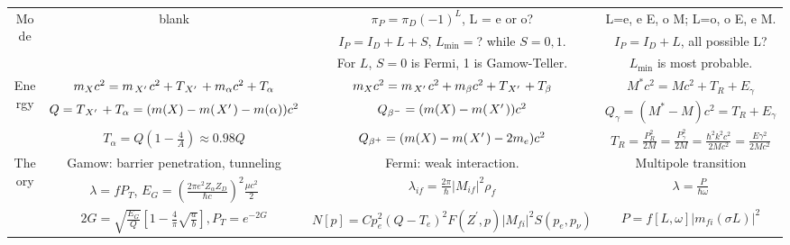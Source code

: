 \documentclass{school-22.101-notes}
\begin{document}
\begin{enumerate}
\begin{table}[ht]
\begin{tabular}{|c|c|c|c|}
    \multirow{3}{*}{Mode} & \multirow{3}{*}{blank} & $\pi_P = \pi_D (-1)^L$, L = e or o? & L=e, e E, o M; L=o, o E, e M. \\
    & & $I_P = I_D + L + S$, $L_{\mathrm{min}} =$? while $S = 0,1$. & $I_P = I_D + L$, all possible L? \\
    & & For $L$, $S=0$ is Fermi, 1 is Gamow-Teller. & $L_{\mathrm{min}}$ is most probable.    \\ \hline
    \multirow{3}{*}{Energy} & $m_X c^2 = m_{\left.X^{\prime}\right.}c^2 + T_{\left.X^{\prime}\right.} + m_{\alpha} c^2 + T_{\alpha}$ 
    & $m_X c^2 = m_{\left.X^{\prime}\right.} c^2 + m_{\beta} c^2 + T_{\left.X^{\prime}\right.} + T_{\beta}$ 
    & $M^* c^2 = Mc^2 + T_R + E_{\gamma}$ 
    \\ 
    & $Q = T_{\left.X^{\prime}\right.} + T_{\alpha} = (m(X) - m(\left.X^{\prime}\right.) - m(\alpha) )c^2$ 
    & $Q_{\beta^-} = (m(X) - m(\left.X^{\prime}\right.))c^2$
    & $Q_{\gamma} =  (M^* - M)c^2  = T_R + E_{\gamma}$
    \\ 
    & $T_{\alpha} = Q \left( 1 - \frac{4}{A} \right) \approx 0.98 Q$ 
    & $Q_{\beta^+} = (m(X) - m(\left.X^{\prime}\right.) - 2m_e) c^2$
    & $T_R = \frac{P_R^2}{2M} = \frac{P_{\gamma}^2}{2M} = \frac{\hbar^2 k^2 c^2}{2Mc^2} = \frac{E \gamma^2}{2Mc^2}$
    \\ \hline
    \multirow{3}{*}{Theory} & Gamow: barrier penetration, tunneling & Fermi: weak interaction. & Multipole transition\\
    & $\lambda = f P_T$, $E_G = \left( \frac{2 \pi e^2 Z_{\alpha} Z_D}{\hbar c} \right)^2 \frac{\mu c^2}{2}$ & $\lambda_{if} = \frac{2\pi}{\hbar} |M_{if}|^2 \rho_f$ & $\lambda = \frac{P}{\hbar \omega}$ \\
    & $2G = \sqrt{\frac{E_G}{Q}} \left[ 1 - \frac{4}{\pi} \sqrt{\frac{a}{b} } \right], P_T = e^{-2G}$ &  $N[p] = C p_e^2 (Q - T_e)^2 F(Z^{\prime}, p) |M_{fi}|^2 S(p_e, p_{\nu})$ & $P = f[L,\omega] |m_{fi} (\sigma L)|^2$ \\ \hline 
    \end{tabular}
\end{table}
\end{enumerate}
\end{document}
